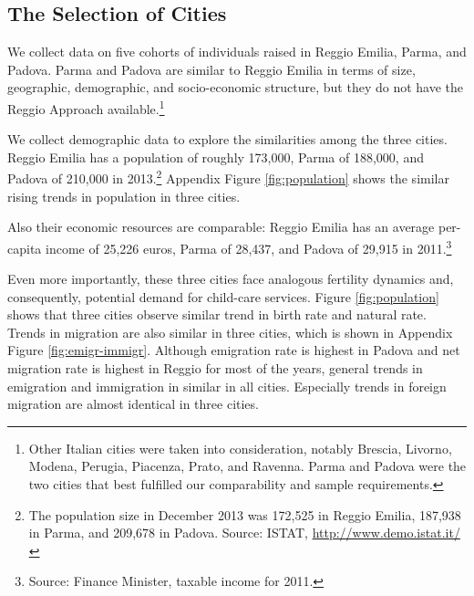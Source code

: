 \subsection{The Selection of Cities}

We collect data on five cohorts of individuals raised in Reggio Emilia, Parma, and Padova. Parma and Padova are similar to Reggio Emilia in terms of size, geographic, demographic, and socio-economic structure, but they do not have the Reggio Approach available.\footnote{Other Italian cities were taken into consideration, notably Brescia, Livorno, Modena, Perugia, Piacenza, Prato, and Ravenna. Parma and Padova were the two cities that best fulfilled our comparability and sample requirements.} 

We collect demographic data to explore the similarities among the three cities. Reggio Emilia has a population of roughly 173,000, Parma of 188,000, and Padova of 210,000 in 2013.\footnote{The population size in December 2013 was 172,525 in Reggio Emilia, 187,938 in Parma, and 209,678 in Padova. Source: ISTAT, \url{http://www.demo.istat.it/}} Appendix Figure \ref{fig:population} shows the similar rising trends in population in three cities. 

Also their economic resources are comparable: Reggio Emilia has an average per-capita income of 25,226 euros, Parma of 28,437, and Padova of 29,915 in 2011.\footnote{Source: Finance Minister, taxable income for 2011.}

Even more importantly, these three cities face analogous fertility dynamics and, consequently, potential demand for child-care services. Figure \ref{fig:population} shows that three cities observe similar trend in birth rate and natural rate. Trends in migration are also similar in three cities, which is shown in Appendix Figure \ref{fig:emigr-immigr}. Although emigration rate is highest in Padova and net migration rate is highest in Reggio for most of the years, general trends in emigration and immigration in similar in all cities. Especially trends in foreign migration are almost identical in three cities.
